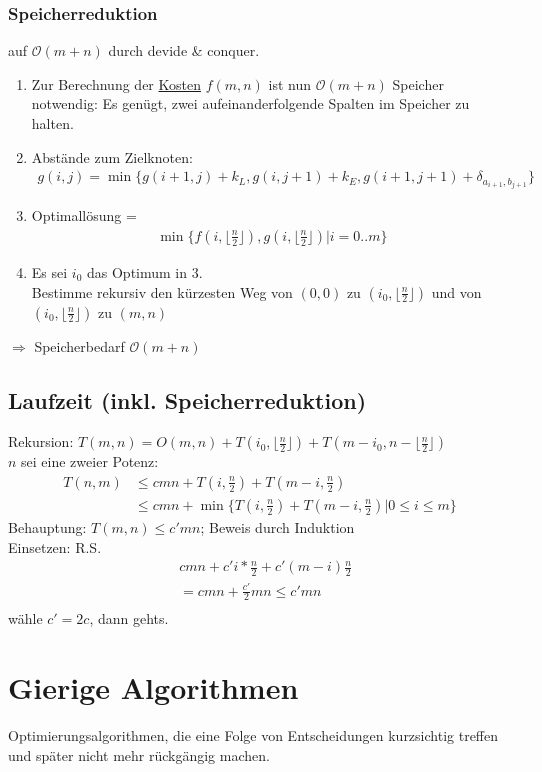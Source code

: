 \subsubsection{Speicherreduktion}
auf $\mathcal{O}(m+n)$ durch devide \& conquer.
\begin{enumerate}
\item Zur Berechnung der \underline{Kosten} $f(m,n)$ ist nun $\mathcal{O}(m+n)$ Speicher notwendig: Es genügt, zwei aufeinanderfolgende Spalten im Speicher zu halten.
\item Abstände zum Zielknoten:
\begin{align*}
g(i,j) = \min	\{ g(i+1,j) + k_L, g(i,j+1) + k_E, g(i+1, j+1) + \delta_{a_{i+1},b_{j+1}}\}
\end{align*}
\item Optimallösung =
\begin{align*}
\min\{ f(i,\lfloor \frac{n}{2} \rfloor) , g(i,\lfloor \frac{n}{2} \rfloor) | i = 0..m\}
\end{align*}
\item Es sei $i_0$ das Optimum in 3.\\
Bestimme rekursiv den kürzesten Weg von $(0,0)$ zu $(i_0, \lfloor \frac{n}{2} \rfloor)$ und von $(i_0, \lfloor \frac{n}{2} \rfloor)$ zu $(m,n)$
\end{enumerate}
$\Rightarrow $ Speicherbedarf $\mathcal{O}(m+n)$
\subsection{Laufzeit (inkl. Speicherreduktion)}
Rekursion: $T(m,n) = O(m,n) + T(i_0,  \lfloor \frac{n}{2} \rfloor) + T(m-i_0, n- \lfloor \frac{n}{2} \rfloor)$\\
$n$ sei eine zweier Potenz:
\begin{align*}
T(n,m) &\leq cmn + T(i, \frac{n}{2}) + T(m-i,\frac{n}{2})\\
&\leq cmn + \min\{ T(i,\frac{n}{2}) + T(m-i, \frac{n}{2}) | 0 \leq i \leq m\}
\end{align*}
Behauptung: $T(m,n) \leq c'mn$; Beweis durch Induktion\\
Einsetzen: R.S.\\
\begin{align*}
&cmn + c' i * \frac{n}{2} + c'(m-i)\frac{n}{2}\\
&= cmn + \frac{c'}{2}mn \leq c'mn\\
\end{align*}
wähle $c'=2c$, dann gehts.\\
\section{Gierige Algorithmen}
Optimierungsalgorithmen, die eine Folge von Entscheidungen kurzsichtig treffen und später nicht mehr rückgängig machen.\\
